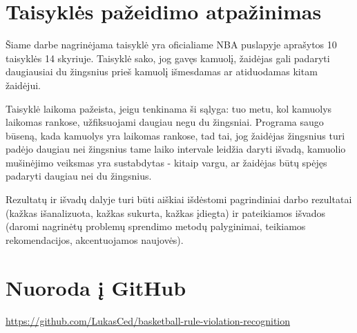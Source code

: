 \documentclass{VUMIFPSkursinis}
\begin{document}
\section{Taisyklės pažeidimo atpažinimas}
Šiame darbe nagrinėjama taisyklė yra oficialiame NBA puslapyje aprašytos 10 taisyklės 14 skyriuje. Taisyklė sako, jog gavęs kamuolį, žaidėjas gali padaryti daugiausiai du žingsnius prieš kamuolį išmesdamas ar atiduodamas kitam žaidėjui. 

Taisyklė laikoma pažeista, jeigu tenkinama ši sąlyga:  tuo metu, kol kamuolys laikomas rankose, užfiksuojami daugiau negu du žingsniai. Programa saugo būseną, kada kamuolys yra laikomas rankose, tad tai, jog žaidėjas žingsnius turi padėjo daugiau nei žingsnius tame laiko intervale leidžia daryti išvadą, kamuolio mušinėjimo veiksmas yra sustabdytas - kitaip vargu, ar žaidėjas būtų spėjęs padaryti daugiau nei du žingsnius. 


Rezultatų ir išvadų dalyje turi būti aiškiai išdėstomi pagrindiniai darbo
rezultatai (kažkas išanalizuota, kažkas sukurta, kažkas įdiegta) ir pateikiamos
išvados (daromi nagrinėtų problemų sprendimo metodų palyginimai, teikiamos
rekomendacijos, akcentuojamos naujovės).

\printbibliography[heading=bibintoc]  %

\appendix  %
\section{Nuoroda į GitHub}
\url{https://github.com/LukasCed/basketball-rule-violation-recognition}
\end{document}
